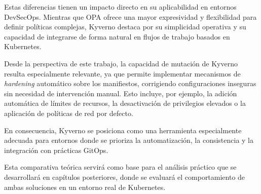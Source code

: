 Estas diferencias tienen un impacto directo en su aplicabilidad en entornos DevSecOps. Mientras que OPA ofrece una mayor expresividad y flexibilidad para definir políticas complejas, Kyverno destaca por su simplicidad operativa y su capacidad de integrarse de forma natural en flujos de trabajo basados en Kubernetes.

Desde la perspectiva de este trabajo, la capacidad de mutación de Kyverno resulta especialmente relevante, ya que permite implementar mecanismos de \textit{hardening} automático sobre los manifiestos, corrigiendo configuraciones inseguras sin necesidad de intervención manual. Esto incluye, por ejemplo, la adición automática de límites de recursos, la desactivación de privilegios elevados o la aplicación de políticas de red por defecto.

En consecuencia, Kyverno se posiciona como una herramienta especialmente adecuada para entornos donde se prioriza la automatización, la consistencia y la integración con prácticas GitOps.

Esta comparativa teórica servirá como base para el análisis práctico que se desarrollará en capítulos posteriores, donde se evaluará el comportamiento de ambas soluciones en un entorno real de Kubernetes.

